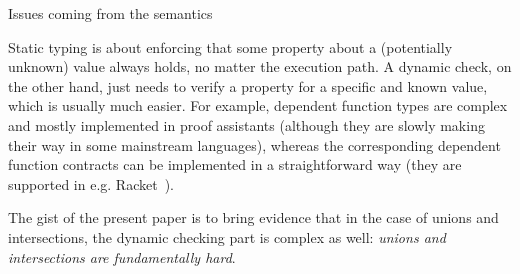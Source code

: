 \documentclass[sigplan,10pt,review,anonymous]{acmart}
\newcommand{\info}[2][1=]{}
\newcommand{\resolved}[2]{}
\begin{document}
\resolved{Either here or the next section, show examples of unintuitive behaviour
of U and I. For example, I is not jos composition of contracts.
And union has to be treated as any one of the options.
Kindo of resolved for unions}



\section{Issues coming from the semantics}
\label{sec:issues-sem}
\info{What goes wrong or difficult when trying to implement union and
  intersection literally}

Static typing is about enforcing that some property about a (potentially
unknown) value always holds, no matter the execution path. A dynamic check, on
the other hand, just needs to verify a property for a specific and known value,
which is usually much easier. For example, dependent function types are complex
and mostly implemented in proof assistants (although they are slowly making
their way in some mainstream languages), whereas the corresponding dependent
function contracts can be implemented in a straightforward way (they are
supported in e.g. Racket~\cite{}).

The gist of the present paper is to bring evidence that in the case of unions
and intersections, the dynamic checking part is complex as well: \emph{unions
and intersections are fundamentally hard}.

%
%
\end{document}
